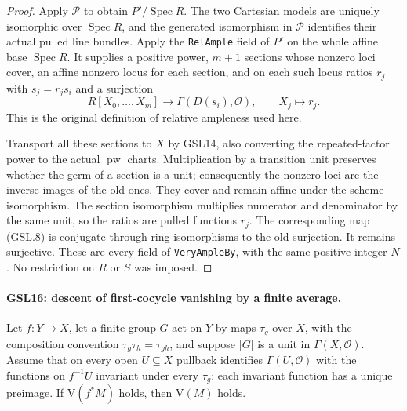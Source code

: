 \documentclass[11pt,a4paper]{article}
\numberwithin{equation}{section}
\theoremstyle{remark}\newtheorem{remark}[theorem]{Remark}
\begin{document}
\begin{proof}
Apply $\mathcal P$ to obtain $P'/\operatorname{Spec}R$.
The two Cartesian models are uniquely isomorphic over
$\operatorname{Spec}R$, and the generated isomorphism in
$\mathcal P$ identifies their actual pulled line bundles.
Apply the \texttt{Rel\allowbreak Ample} field of $P'$ on the whole affine
base $\operatorname{Spec}R$.  It supplies a positive power,
$m+1$ sections whose nonzero loci cover, an affine nonzero
locus for each section, and on each such locus ratios $r_j$
with $s_j=r_js_i$ and a surjection
\[
 R[X_0,\ldots,X_m]\longrightarrow
 \Gamma(D(s_i),\mathcal O),\qquad X_j\longmapsto r_j.
 \tag{GSL.8}
\]
This is the original definition of relative ampleness used here.

Transport all these sections to $X$ by GSL14, also converting
the repeated-factor power to the actual $\operatorname{pw}$
charts.  Multiplication by a transition unit preserves whether
the germ of a section is a unit; consequently the nonzero
loci are the inverse images of the old ones.  They cover and
remain affine under the scheme isomorphism.  The section
isomorphism multiplies numerator and denominator by the
same unit, so the ratios are pulled functions $r_j$.
The corresponding map (GSL.8) is conjugate through ring
isomorphisms to the old surjection.  It remains surjective.
These are every field of \texttt{Very\allowbreak Ample\allowbreak By}, with the same
positive integer $N$.  No restriction on $R$ or $S$ was imposed.
\end{proof}

\paragraph{GSL16: descent of first-cocycle vanishing by a finite average.}
\label{claim:GSL16}
Let $f:Y\to X$, let a finite group $G$ act on $Y$ by maps
$\tau_g$ over $X$, with the composition convention
$\tau_g\tau_h=\tau_{gh}$, and suppose $|G|$ is a unit in
$\Gamma(X,\mathcal O)$.  Assume that on every open $U\subseteq X$
pullback identifies $\Gamma(U,\mathcal O)$ with the functions on
$f^{-1}U$ invariant under every $\tau_g$: each invariant function
has a unique preimage.  If $\mathrm V(f^*M)$ holds, then
$\mathrm V(M)$ holds.
\end{document}
